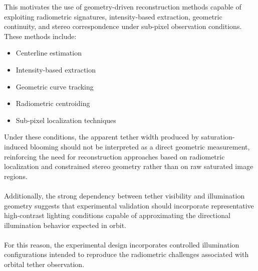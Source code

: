 This motivates the use of geometry-driven reconstruction methods capable of exploiting radiometric signatures, intensity-based extraction, geometric continuity, and stereo correspondence under sub-pixel observation conditions. These methods include:
\begin{itemize}
    \item Centerline estimation
    \item Intensity-based extraction
    \item Geometric curve tracking
    \item Radiometric centroiding
    \item Sub-pixel localization techniques
\end{itemize}

Under these conditions, the apparent tether width produced by saturation-induced blooming should not be interpreted as a direct geometric measurement, reinforcing the need for reconstruction approaches based on radiometric localization and constrained stereo geometry rather than on raw saturated image regions.
\\\\
Additionally, the strong dependency between tether visibility and illumination geometry suggests that experimental validation should incorporate representative high-contrast lighting conditions capable of approximating the directional illumination behavior expected in orbit.
\\\\
For this reason, the experimental design incorporates controlled illumination configurations intended to reproduce the radiometric challenges associated with orbital tether observation.
